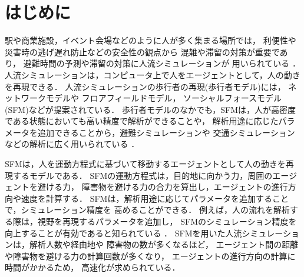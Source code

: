 \newcommand{\tensaku}[1]{}

\chapter{はじめに}
\label{sec:intro}
\tensaku{\section{人流シミュレーションの背景と需要}}
駅や商業施設，イベント会場などのように人が多く集まる場所では，
利便性や災害時の逃げ遅れ防止などの安全性の観点から
混雑や滞留の対策が重要であり\cite{taisaku1}\cite{taisaku2}，
避難時間の予測や滞留の対策に人流シミュレーションが
用いられている
\cite{sim_jirei1}\cite{sim_jirei2}\cite{sim_jirei3}\cite{sim_jirei8}\cite{sim_jirei7}．
人流シミュレーションは，コンピュータ上で人をエージェントとして，人の動きを再現できる．
人流シミュレーションの歩行者の再現(歩行者モデル)には，
ネットワークモデルや
フロアフィールドモデル\cite{floa_field3}\cite{floa_field1}\cite{floa_field2}，
ソーシャルフォースモデル(SFM)\cite{helbing_sfm}などが提案されている．
歩行者モデルのなかでも，SFMは，人が高密度である状態においても高い精度で解析ができることや，
解析用途に応じたパラメータを追加できることから，避難シミュレーションや
交通シミュレーションなどの解析に広く用いられている
\cite{mas_pandemic}\cite{sfm_hinan1}\cite{sfm_hinan2}\cite{sfm_hinan3}
\cite{intro_gunshu}．

\tensaku{\section{ソーシャルフォースモデル}}
SFMは，人を運動方程式に基づいて移動するエージェントとして人の動きを再現するモデルである．
SFMの運動方程式は，目的地に向かう力，周囲のエージェントを避ける力，
障害物を避ける力の合力を算出し，エージェントの進行方向や速度を計算する．
SFMは，解析用途に応じてパラメータを追加することで，シミュレーション精度を
高めることができる．
例えば，人の流れを解析する際は，視野を再現するパラメータを追加し，
SFMのシミュレーション精度を向上することが有効であると知られている
\cite{siya_ex2}\cite{siya_ex3}\cite{siya_ex4}
\cite{siya_ex5}\cite{siya_ex6}\cite{siya_ex7}．
SFMを用いた人流シミュレーションは，解析人数や経由地や
障害物の数が多くなるほど，
エージェント間の距離や障害物を避ける力の計算回数が多くなり，
エージェントの進行方向の計算に時間がかかるため，
高速化が求められている．

